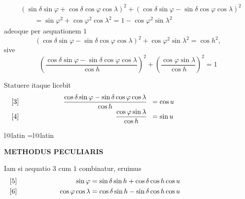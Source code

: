 {\[
\begin{aligned}
&(\sin\delta\sin\varphi+\cos\delta\cos\varphi\cos\lambda)^2+(\cos\delta\sin\varphi-\sin\delta\cos\varphi\cos\lambda)^2\\
&\qquad=\sin\varphi^2+\cos\varphi^2\cos\lambda^2=1-\cos\varphi^2\sin\lambda^2
\end{aligned}
\]
adeoque per aequationem $1$
\[
(\cos\delta\sin\varphi-\sin\delta\cos\varphi\cos\lambda)^2+\cos\varphi^2\sin\lambda^2=\cos h^2,
\]
sive
\[
\left(\frac{\cos\delta\sin\varphi-\sin\delta\cos\varphi\cos\lambda}{\cos h}\right)^2+\left(\frac{\cos\varphi\sin\lambda}{\cos h}\right)^2=1
\]

Statuere itaque licebit
\[
\begin{array}{@{}l@{}}
\GaussVIPoliEquationRow{3}{.56}{\dfrac{\cos\delta\sin\varphi-\sin\delta\cos\varphi\cos\lambda}{\cos h}}{\cos u}\\[4pt]
\GaussVIPoliEquationRow{4}{.56}{\dfrac{\cos\varphi\sin\lambda}{\cos h}}{\sin u}
\end{array}
\]

\par}
\GaussVIGathering{}{6\textsuperscript{*}}
\clearpage
\endgroup
\clearpage
\begingroup
\pagestyle{empty}
\ifcsname l@latin\endcsname
  \language=\csname l@latin\endcsname\relax
   
\fi
\setlength{\abovedisplayskip}{7pt}
\setlength{\belowdisplayskip}{7pt}
\setlength{\abovedisplayshortskip}{5pt}
\setlength{\belowdisplayshortskip}{5pt}
\setlength{\jot}{2pt}
\thispagestyle{empty}
\noindent{}%
%
\parbox[t]{\dimexpr\linewidth-24mm\relax}{\centering\footnotesize\bfseries METHODUS PECULIARIS\par}%
\makebox[12mm][r]{}\par\nobreak\medskip
\newcommand{\GaussVIPoliLabel}[2]{%
  \makebox[0pt][l]{[#1]}%
  \makebox[.34\linewidth][r]{$\displaystyle #2$}%
}
\newcommand{\GaussVIPoliAligned}[1]{%
  \[\makebox[\linewidth][l]{$\displaystyle\begin{aligned}#1\end{aligned}$}\]%
}
\newcommand{\GaussVIPoliSingle}[2]{%
  \[\makebox[\linewidth][l]{%
    \makebox[0pt][l]{[#1]}%
    \makebox[\linewidth][c]{$\displaystyle #2$}}%
  \]%
}
Iam si aequatio $3$ cum $1$ combinatur, eruimus
\GaussVIPoliAligned{
\GaussVIPoliLabel{5}{\sin\varphi}&=\sin\delta\sin h+\cos\delta\cos h\cos u\\
\GaussVIPoliLabel{6}{\cos\varphi\cos\lambda}&=\cos\delta\sin h-\sin\delta\cos h\cos u
}

